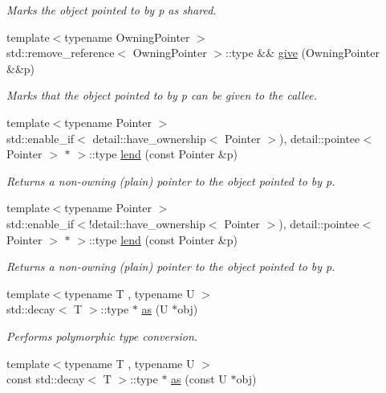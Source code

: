 \begin{DoxyCompactItemize}
\begin{DoxyCompactList}\small\item\em Marks the object pointed to by {\ttfamily p} as shared. \end{DoxyCompactList}\item 
{\footnotesize template$<$typename Owning\+Pointer $>$ }\\std\+::remove\+\_\+reference$<$ Owning\+Pointer $>$\+::type \&\& \hyperlink{namespacegko_acbd3fd6d07e498892881e8e2ab0b4167}{give} (Owning\+Pointer \&\&p)
\begin{DoxyCompactList}\small\item\em Marks that the object pointed to by {\ttfamily p} can be given to the callee. \end{DoxyCompactList}\item 
{\footnotesize template$<$typename Pointer $>$ }\\std\+::enable\+\_\+if$<$ detail\+::have\+\_\+ownership$<$ Pointer $>$), detail\+::pointee$<$ Pointer $>$ $\ast$ $>$\+::type \hyperlink{namespacegko_aa8cb4876b72e5e1036ea9575443c439b}{lend} (const Pointer \&p)
\begin{DoxyCompactList}\small\item\em Returns a non-\/owning (plain) pointer to the object pointed to by {\ttfamily p}. \end{DoxyCompactList}\item 
{\footnotesize template$<$typename Pointer $>$ }\\std\+::enable\+\_\+if$<$!detail\+::have\+\_\+ownership$<$ Pointer $>$), detail\+::pointee$<$ Pointer $>$ $\ast$ $>$\+::type \hyperlink{namespacegko_aa0c1deeb105cfb5a635b5f41cb5e8321}{lend} (const Pointer \&p)
\begin{DoxyCompactList}\small\item\em Returns a non-\/owning (plain) pointer to the object pointed to by {\ttfamily p}. \end{DoxyCompactList}\item 
{\footnotesize template$<$typename T , typename U $>$ }\\std\+::decay$<$ T $>$\+::type $\ast$ \hyperlink{namespacegko_a73ce7e87aec389b5210630bb617b4baa}{as} (U $\ast$obj)
\begin{DoxyCompactList}\small\item\em Performs polymorphic type conversion. \end{DoxyCompactList}\item 
{\footnotesize template$<$typename T , typename U $>$ }\\const std\+::decay$<$ T $>$\+::type $\ast$ \hyperlink{namespacegko_a289e84ef5dea2f579dd12f27140a1470}{as} (const U $\ast$obj)

\end{DoxyCompactItemize}
